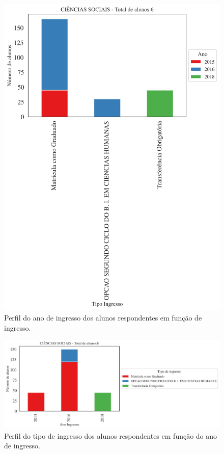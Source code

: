 \documentclass[a4paper,10pt]{article}
\begin{document}
\begin{figure}[h]
\centering
\includegraphics[width=0.85\linewidth]{ingresso_discentes_curso_ano_313087.png}
\caption{\label{fig:ingresso_ano} Perfil do ano de ingresso dos alunos respondentes em função de ingresso.}
\end{figure}

\begin{figure}[h]
\centering
\includegraphics[width=0.85\linewidth]{ingresso_discentes_curso_tipo_313087.png}
\caption{\label{fig:tipo_ingresso_ano}  Perfil  do tipo de ingresso dos alunos respondentes  em função do ano de ingresso.}
\end{figure}
\end{document}
